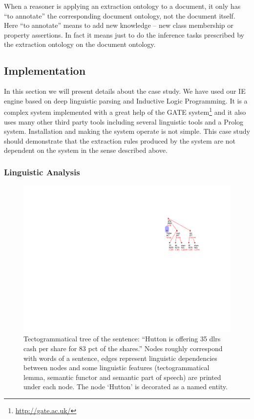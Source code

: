 \documentclass[10pt, conference, compsocconf]{IEEEtran}
\begin{document}
When a reasoner is applying an extraction ontology to a document, it only has ``to annotate'' the corresponding document ontology, not the document itself. Here ``to annotate'' means to add new knowledge -- new class membership or property assertions. In fact it means just to do the inference tasks prescribed by the extraction ontology on the document ontology. 


\subsection{Implementation}

In this section we will present details about the case study.  We have used our IE engine \cite{biblio:DedekISWC2010} based on deep linguistic parsing and Inductive Logic Programming. It is a complex system implemented with a great help of the GATE system\footnote{\url{http://gate.ac.uk/}} \cite{dedek:GATE_ACL2002} and it also uses many other third party tools including several linguistic tools and a Prolog system. Installation and making the system operate is not simple. This case study should demonstrate that the extraction rules produced by the system are not dependent on the system in the sense described above.




\subsubsection{Linguistic Analysis}


\begin{figure}
\centerline{\includegraphics[width=0.7\hsize]{tree}}
\caption{Tectogrammatical tree of the sentence: ``Hutton is offering 35 dlrs cash per share for 83 pct of the shares.''
Nodes roughly correspond with words of a sentence, edges represent linguistic dependencies between nodes and some linguistic features (tectogrammatical lemma, semantic functor and semantic part of speech) are printed under each node. The node `Hutton' is decorated as a named entity.}
\label{img:tree}
\end{figure}
\end{document}
